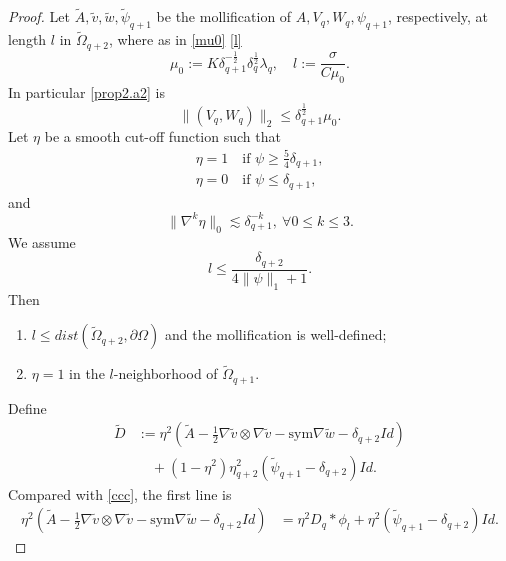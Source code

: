 \documentclass[reqno,12pt]{amsart}
\numberwithin{equation}{section}
\theoremstyle{plain}
\theoremstyle{definition}
\newcommand{\sym}{\text{sym}}
\begin{document}
\begin{proof}
Let $\tilde A,\tilde v,\tilde w,\tilde\psi_{q+1}$ be the mollification of $A,V_q,W_q,\psi_{q+1}$, respectively, at length $l$ in $\tilde\Omega_{q+2}$, where as in \eqref{mu0} \eqref{l}
\begin{equation}\label{ll}
     \mu_0 := K\delta_{q+1}^{-\frac{1}{2}}\delta_{q}^\frac{1}{2}\lambda_q,\quad l:=\frac{\sigma}{C\mu_0}.
\end{equation}
In particular \eqref{prop2.a2} is
\begin{equation}\label{prop2.a2'}
    \|(V_q,W_q)\|_2\le \delta_{q+1}^\frac{1}{2}\mu_0.
\end{equation}
Let $\eta$ be a smooth cut-off function such that
\begin{gather*}
    \eta=1\quad\text{if } \psi\ge\frac{5}{4}\delta_{q+1},\\
    \eta=0\quad\text{if } \psi\le\delta_{q+1},
\end{gather*}
and
\begin{equation}
    \|\nabla^k\eta\|_0\lesssim \delta_{q+1}^{-k},\ \forall 0\le k\le 3.
\end{equation}
We assume
\begin{equation}\label{ineq999}
    l\le \frac{\delta_{q+2}}{4\|\psi\|_1+1}.
\end{equation}
Then
\begin{enumerate}
    \item[($l_1$)] $l\le dist(\tilde\Omega_{q+2},\partial\Omega)$ and the mollification is well-defined;
    \item[($l_2$)] $\eta=1$ in the $l$-neighborhood of $\tilde\Omega_{q+1}$.
\end{enumerate} 
Define
\begin{equation}\label{tildeD}
\begin{aligned}
    \tilde D &:= \eta^2(\tilde A-\frac{1}{2} \nabla\tilde v\otimes\nabla\tilde v-\sym\nabla\tilde w-\delta_{q+2}Id)\\
    &\quad+(1-\eta^2)\eta_{q+2}^2(\tilde\psi_{q+1}-\delta_{q+2})Id. 
\end{aligned}
\end{equation}
Compared with \eqref{ccc}, the first line is
\begin{equation*}
\begin{aligned}
    \eta^2(\tilde A-\frac{1}{2} \nabla\tilde v\otimes\nabla\tilde v-\sym\nabla\tilde w-\delta_{q+2}Id) &=\eta^2 D_q*\phi_l+\eta^2(\tilde\psi_{q+1}-\delta_{q+2})Id.
\end{aligned}

\end{equation*}
\end{proof}
\end{document}
